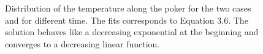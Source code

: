 \documentclass[10 pt]{article}
\numberwithin{equation}{section}
\begin{document}
\begin{figure}[H]
\centering
{}
\newline
\hspace{1pt}
\caption{Distribution of the temperature along the poker for the two cases and for different time. The fits corresponds to Equation 3.6. The solution behaves like a decreasing exponential at the beginning and converges to a decreasing linear function.}
\end{figure}
\end{document}
